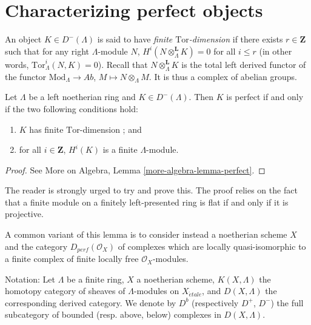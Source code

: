 \section{Characterizing perfect objects}
\label{section-characterizing-perfect}

\begin{definition}
\label{definition-finite-tor-dimension}
An object $K\in D^-(\Lambda)$ is said to have
{\it finite $\text{Tor}$-dimension}
if there exists $r\in \mathbf{Z}$ such that for any
right $\Lambda$-module $N$, $H^i(N \otimes_{\Lambda}^\mathbf{L} K) = 0$ for all
$i \leq r$ (in other words, $\text{Tor}^i_\Lambda (N, K) = 0$). Recall that
$N \otimes^\mathbf{L}_{\Lambda}K$ is the total left derived functor of the
functor $\text{Mod}_{\Lambda} \to \textit{Ab}$,
$M \mapsto N \otimes_{\Lambda} M$.
It is thus a complex of abelian groups.
\end{definition}

\begin{lemma}
\label{lemma-characterize-perfect}
Let $\Lambda$ be a left noetherian ring and $K\in D^-(\Lambda)$. Then $K$ is
perfect if and only if the two following conditions hold:
\begin{enumerate}
\item
$K$ has finite $\text{Tor}$-dimension ; and
\item
for all $i \in \mathbf{Z}$, $H^i(K)$ is a finite $\Lambda$-module.
\end{enumerate}
\end{lemma}

\begin{proof}
See More on Algebra, Lemma \ref{more-algebra-lemma-perfect}.
\end{proof}

\noindent
The reader is strongly urged to try and prove this. The proof relies on the
fact that a finite module on a finitely left-presented ring is flat if and only
if it is projective.

\begin{remark}
\label{remark-variant}
A common variant of this lemma is to consider instead a noetherian scheme $X$
and the category $D_{perf}(\mathcal{O}_X)$ of complexes which are locally
quasi-isomorphic to a finite complex of finite locally free
$\mathcal{O}_X$-modules.
\end{remark}

\noindent
Notation: Let $\Lambda$ be a finite ring, $X$ a noetherian scheme,
$K(X, \Lambda)$ the
homotopy category of sheaves of $\Lambda$-modules on $X_{\acute{e}tale}$, and
$D(X, \Lambda)$ the corresponding derived category. We denote by $D^b$
(respectively $D^+$, $D^-$) the full subcategory of bounded
(resp. above, below) complexes in $D(X, \Lambda)$.

